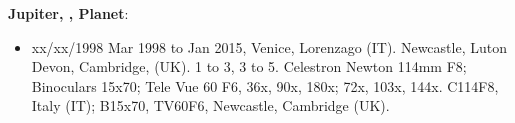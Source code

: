 {\bf Jupiter, , Planet}:
\begin{itemize}
\item xx/xx/1998 Mar 1998 to Jan 2015, Venice, Lorenzago (IT). Newcastle, Luton Devon, Cambridge, (UK). 1 to 3, 3 to 5. Celestron Newton 114mm F8; Binoculars 15x70; Tele Vue 60 F6, 36x, 90x, 180x; 72x, 103x, 144x. C114F8, Italy (IT); B15x70, TV60F6, Newcastle, Cambridge (UK).
\end{itemize}
